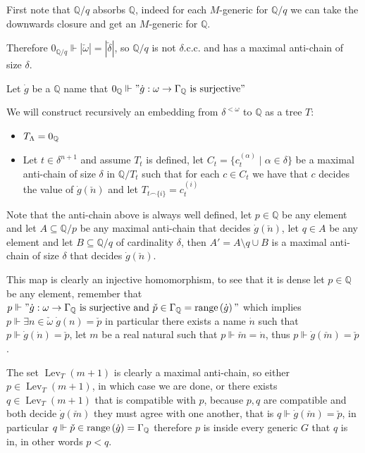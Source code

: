 \begin{cExercise}
	First note that $\mathbb Q/q$ absorbs $\mathbb Q$, indeed for each $M$-generic for $\mathbb Q/q$ we can take the downwards closure and get an $M$-generic for $\mathbb Q$.
	
	Therefore $0_{\mathbb Q/q}\Vdash |\check{\omega}|=|\check{\delta}|$, so $\mathbb Q/q$ is not $\delta$.c.c. and has a maximal anti-chain of size $\delta$.
	
	Let $\dot g$ be a $\mathbb Q$ name that $0_\mathbb Q\Vdash"\dot g:\omega\to \Gamma_\mathbb Q\text{ is surjective}"$
	
	We will construct recursively an embedding from $\delta^{<\omega}$ to $\mathbb Q$ as a tree $T$:
	
	\begin{itemize}
		\item $T_\Lambda=0_\mathbb Q$
		\item Let $t\in \delta^{n+1}$ and assume $T_t$ is defined, let $C_t=\{c_t^{(\alpha)}\mid \alpha\in\delta\}$ be a maximal anti-chain of size $\delta$ in $\mathbb Q/ T_t$ such that for each $c\in C_t$ we have that $c$ decides the value of $\dot g(\check n)$ and let $T_{t\frown\{i\}}=c_t^{(i)}$
	\end{itemize}
	
	Note that the anti-chain above is always well defined, let $p\in\mathbb Q$ be any element and let $A\subseteq \mathbb Q/p$ be any maximal anti-chain that decides $\dot g(\check n)$, let $q\in A$ be any element and let $B\subseteq \mathbb Q/q$ of cardinality $\delta$, then $A'=A\setminus q\cup B$ is a maximal anti-chain of size $\delta$ that decides $\dot g(\check n)$.
	
	This map is clearly an injective homomorphism, to see that it is dense let $p\in \mathbb Q$ be any element, remember that $p\Vdash "\dot g:\omega\to \Gamma_\mathbb Q\text{ is surjective and }\check p\in\Gamma_\mathbb Q=\operatorname{range}\left(\dot g\right)"$ which implies $p\Vdash\exists n\in\check\omega\;\dot g(n)=\check p$ in particular there exists a name $\dot n$ such that $p\Vdash \dot g(\dot n)=\check p$, let $m$ be a real natural such that $p\Vdash \check m=\dot n$, thus $p\Vdash \dot g(\check m)=\check p$.
	
	The set $\operatorname{Lev}_T(m+1)$ is clearly a maximal anti-chain, so either $p\in \operatorname{Lev}_T(m+1)$, in which case we are done, or there exists $q\in \operatorname{Lev}_T(m+1)$ that is compatible with $p$, because $p,q$ are compatible and both decide $\dot g(\check m)$ they must agree with one another, that is $q\Vdash \dot g(\check m)=\check p$, in particular $q\Vdash \check p\in \operatorname{range}\left(\dot g\right)=\Gamma_\mathbb Q$ therefore $p$ is inside every generic $G$ that $q$ is in, in other words $p<q$.
	

\end{cExercise}
